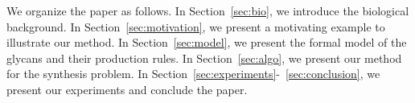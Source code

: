 We organize the paper as follows.
In Section~\ref{sec:bio}, we introduce the biological background.
In Section~\ref{sec:motivation}, we present a motivating example to illustrate our method.
In Section~\ref{sec:model}, we present the formal model of the glycans
and their production rules.
In Section~\ref{sec:algo}, we present our method for the synthesis problem.
In Section~\ref{sec:experiments}-~\ref{sec:conclusion}, we present our experiments and conclude the paper. %



